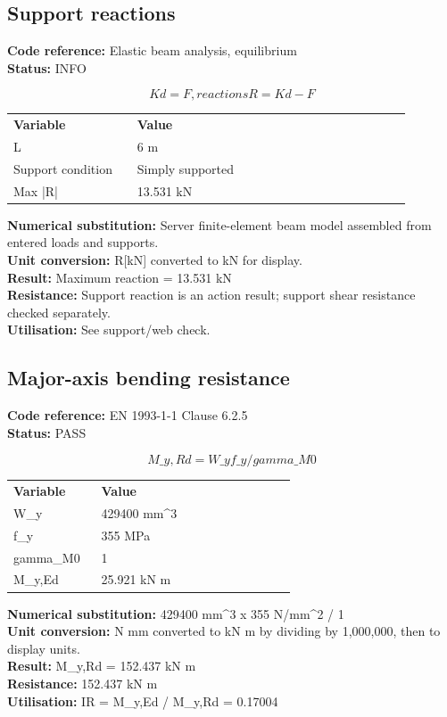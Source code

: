 \documentclass[11pt,a4paper]{article}
\begin{document}
\subsection{Support reactions}
\textbf{Code reference:} Elastic beam analysis, equilibrium\\
\textbf{Status:} INFO

\[
K d = F, reactions R = Kd - F
\]

\begin{longtable}{p{0.28\linewidth}p{0.62\linewidth}}
\textbf{Variable} & \textbf{Value} \\
L & 6 m \\
Support condition & Simply supported \\
Max |R| & 13.531 kN \\
\end{longtable}

\textbf{Numerical substitution:} Server finite-element beam model assembled from entered loads and supports.\\
\textbf{Unit conversion:} R[kN] converted to kN for display.\\
\textbf{Result:} Maximum reaction = 13.531 kN\\
\textbf{Resistance:} Support reaction is an action result; support shear resistance checked separately.\\
\textbf{Utilisation:} See support/web check.\\


\subsection{Major-axis bending resistance}
\textbf{Code reference:} EN 1993-1-1 Clause 6.2.5\\
\textbf{Status:} PASS

\[
M\_y,Rd = W\_y f\_y / gamma\_M0
\]

\begin{longtable}{p{0.28\linewidth}p{0.62\linewidth}}
\textbf{Variable} & \textbf{Value} \\
W\_y & 429400 mm\textasciicircum{}3 \\
f\_y & 355 MPa \\
gamma\_M0 & 1 \\
M\_y,Ed & 25.921 kN m \\
\end{longtable}

\textbf{Numerical substitution:} 429400 mm\textasciicircum{}3 x 355 N/mm\textasciicircum{}2 / 1\\
\textbf{Unit conversion:} N mm converted to kN m by dividing by 1,000,000, then to display units.\\
\textbf{Result:} M\_y,Rd = 152.437 kN m\\
\textbf{Resistance:} 152.437 kN m\\
\textbf{Utilisation:} IR = M\_y,Ed / M\_y,Rd = 0.17004\\
\end{document}
